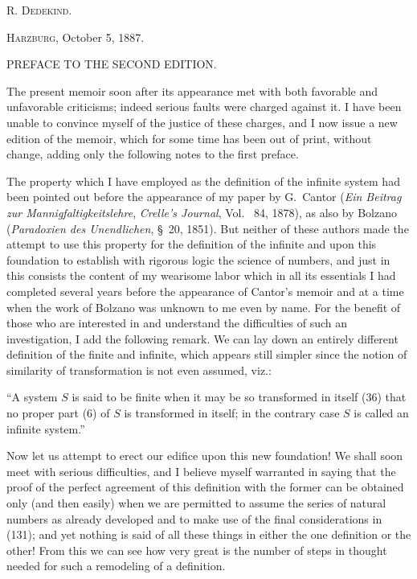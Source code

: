 \documentclass[oneside]{book}
\begin{document}
\begin{flushright}
\textsc{R. Dedekind.}\mbox\qquad
\end{flushright}

\textsc{Harzburg}, October 5, 1887.

\newpage
\begin{center}
{\large PREFACE TO THE SECOND EDITION.}
\end{center}

The present memoir soon after its appearance met
with both favorable and unfavorable criticisms;
indeed serious faults were charged against it. I have
been unable to convince myself of the justice of these
charges, and I now issue a new edition of the memoir,
which for some time has been out of print, without
change, adding only the following notes to the first
preface.

The property which I have employed as the definition
of the infinite system had been pointed out before
the appearance of my paper by G.~Cantor (\textit{Ein
Beitrag zur Mannigfaltigkeitslehre}, \textit{Crelle's Journal}, Vol.~%
84, 1878), as also by Bolzano (\textit{Paradoxien des Unendlichen},
§~20, 1851). But neither of these authors made
the attempt to use this property for the definition of
the infinite and upon this foundation to establish with
rigorous logic the science of numbers, and just in this
consists the content of my wearisome labor which in
all its essentials I had completed several years before
the appearance of Cantor's memoir and at a time
when the work of Bolzano was unknown to me even
by name. For the benefit of those who are interested
in and understand the difficulties of such an investigation,
I add the following remark. We can lay down
an entirely different definition of the finite and infinite,
which appears still simpler since the notion of similarity
of transformation is not even assumed, viz.:

``A system $S$ is said to be finite when it may be so
transformed in itself (36) that no proper part (6) of $S$
is transformed in itself; in the contrary case $S$ is
called an infinite system.''

Now let us attempt to erect our edifice upon this
new foundation! We shall soon meet with serious
difficulties, and I believe myself warranted in saying
that the proof of the perfect agreement of this definition
with the former can be obtained only (and then
easily) when we are permitted to assume the series of
natural numbers as already developed and to make
use of the final considerations in (131); and yet nothing
is said of all these things in either the one definition
or the other! From this we can see how very
great is the number of steps in thought needed for
such a remodeling of a definition.
\end{document}
